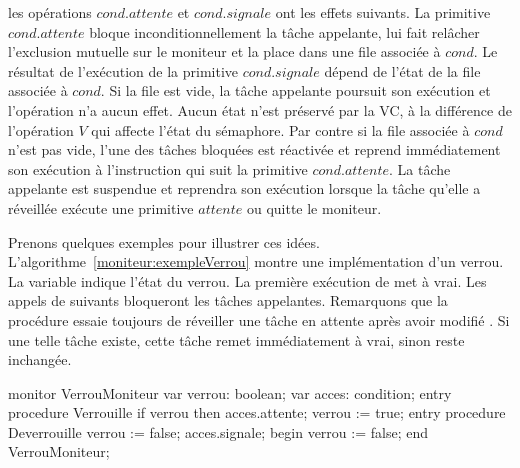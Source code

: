 les opérations $cond.attente$ et $cond.signale$ ont les effets suivants. La primitive $cond.attente$ bloque inconditionnellement la tâche appelante, lui fait relâcher l'exclusion mutuelle sur le moniteur et la place dans une file associée à $cond$. Le résultat de l'exécution de la primitive $cond.signale$ dépend de l'état de la file associée à $cond$. Si la file est vide, la tâche appelante poursuit son exécution et l'opération n'a aucun effet.  Aucun état n'est préservé par la VC, à la différence de l'opération $V$ qui affecte l'état du sémaphore. Par contre si la file associée à $cond$ n'est pas vide, l'une des tâches bloquées est réactivée et reprend immédiatement son exécution à l'instruction qui suit la primitive $cond.attente$. La tâche appelante est suspendue et reprendra son exécution lorsque la tâche qu'elle a réveillée exécute une primitive $attente$ ou quitte le moniteur.

Prenons quelques exemples pour illustrer ces idées. L'algorithme~\ref{moniteur:exempleVerrou} montre une implémentation d'un verrou. La variable  indique l'état du verrou. La première exécution de  met  à vrai. Les appels de  suivants bloqueront les tâches appelantes.  Remarquons que la procédure  essaie toujours de réveiller une tâche en attente après avoir modifié . Si une telle tâche existe, cette tâche remet immédiatement  à vrai, sinon  reste inchangée.

\begin{codeblock}[title=Verrou par moniteur,label=moniteur:exempleVerrou]
monitor VerrouMoniteur {
   var verrou: boolean;
   var acces: condition;
   entry procedure Verrouille {
      if verrou then acces.attente;
      verrou := true;
   }
   entry procedure Deverrouille {
      verrou := false;
      acces.signale;
   }
   begin verrou := false;
   end VerrouMoniteur;
}
\end{codeblock}

